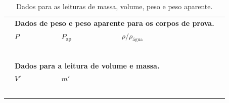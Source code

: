 \begin{table}
\label{Tab:DadosEmpuxo}
	\begin{center}
		\begin{tabular}{cp{25mm}p{25mm}p{25mm}c}
		\toprule
		&\multicolumn{3}{l}{\textbf{Dados de peso e peso aparente para os corpos de prova.}} \\
		\cmidrule{2-4}
		& $P$ & $P_{\textrm{ap}}$ & $\rho/\rho_{\textrm{água}}$ & \\
		\cmidrule{2-4}
		& \cellcolor[gray]{0.89} & \cellcolor[gray]{0.92} & \cellcolor[gray]{0.89} \\
		& \cellcolor[gray]{0.95} & \cellcolor[gray]{0.97} & \cellcolor[gray]{0.95} \\
		& \cellcolor[gray]{0.89} & \cellcolor[gray]{0.92} & \cellcolor[gray]{0.89} \\
		& \cellcolor[gray]{0.95} & \cellcolor[gray]{0.97} & \cellcolor[gray]{0.95} \\
		& \cellcolor[gray]{0.89} & \cellcolor[gray]{0.92} & \cellcolor[gray]{0.89} \\
\\
		&\multicolumn{3}{l}{\textbf{Dados para a leitura de volume e massa.}} \\
		\cmidrule{2-3}
		& $V'$ & $m'$ \\
		\cmidrule{2-3}
		& \cellcolor[gray]{0.89} & \cellcolor[gray]{0.92} \\
		& \cellcolor[gray]{0.95} & \cellcolor[gray]{0.97} \\
		& \cellcolor[gray]{0.89} & \cellcolor[gray]{0.92} \\
		& \cellcolor[gray]{0.95} & \cellcolor[gray]{0.97} \\
		& \cellcolor[gray]{0.89} & \cellcolor[gray]{0.92} \\
		\cmidrule{2-3}
		\cmidrule{2-4}
		\bottomrule
		\end{tabular}
	\end{center}
	\caption{Dados para as leituras de massa, volume, peso e peso aparente.}
\end{table}
%
